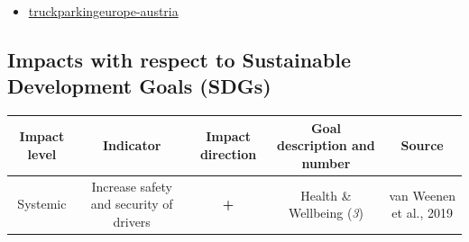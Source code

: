 \documentclass[
]{book}
\providecommand{\tightlist}{%
  \setlength{\itemsep}{0pt}\setlength{\parskip}{0pt}}
\begin{document}
\begin{itemize}
\tightlist
\item
  \href{https://www.truckparkingeurope.com/secure-truck-parking-overview/austria/}{truckparkingeurope-austria}
\end{itemize}

\hypertarget{impacts-with-respect-to-sustainable-development-goals-sdgs-31}{%
\subsection*{Impacts with respect to Sustainable Development Goals (SDGs)}\label{impacts-with-respect-to-sustainable-development-goals-sdgs-31}}

\begin{longtable}[]{@{}ccccc@{}}
\toprule
\begin{minipage}[b]{0.17\columnwidth}\centering
Impact level\strut
\end{minipage} & \begin{minipage}[b]{0.16\columnwidth}\centering
Indicator\strut
\end{minipage} & \begin{minipage}[b]{0.17\columnwidth}\centering
Impact direction\strut
\end{minipage} & \begin{minipage}[b]{0.17\columnwidth}\centering
Goal description and number\strut
\end{minipage} & \begin{minipage}[b]{0.17\columnwidth}\centering
Source\strut
\end{minipage}\tabularnewline
\midrule
\endhead
\begin{minipage}[t]{0.17\columnwidth}\centering
Systemic\strut
\end{minipage} & \begin{minipage}[t]{0.16\columnwidth}\centering
Increase safety and security of drivers\strut
\end{minipage} & \begin{minipage}[t]{0.17\columnwidth}\centering
\textbf{+}\strut
\end{minipage} & \begin{minipage}[t]{0.17\columnwidth}\centering
Health \& Wellbeing (\emph{3})\strut
\end{minipage} & \begin{minipage}[t]{0.17\columnwidth}\centering
van Weenen et al., 2019\strut
\end{minipage}\tabularnewline

\end{longtable}
\end{document}
